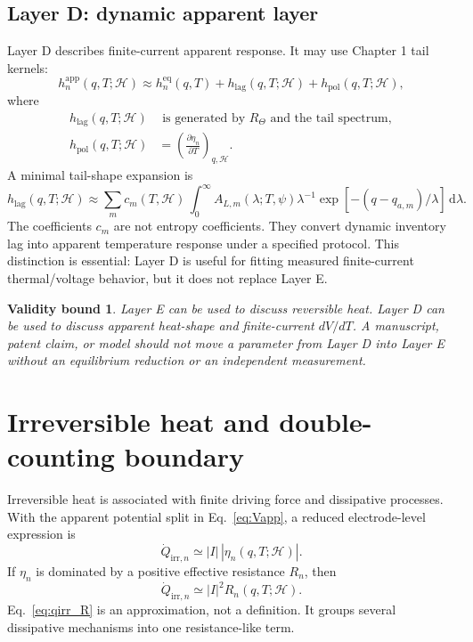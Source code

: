 \documentclass[11pt,a4paper]{article}
\newtheorem*{boundbox}{Validity bound}
\newcommand{\dd}{\mathrm{d}}
\newcommand{\eqs}{\mathrm{eq}}
\newcommand{\app}{\mathrm{app}}
\newcommand{\irr}{\mathrm{irr}}
\newcommand{\pol}{\mathrm{pol}}
\newcommand{\lag}{\mathrm{lag}}
\newcommand{\calH}{\mathcal H}
\begin{document}
\subsection{Layer D: dynamic apparent layer}\label{sec:layer_D}

Layer D describes finite-current apparent response. It may use Chapter 1 tail kernels:
\begin{equation}
h_n^{\app}(q,T;\calH)
\approx
h_n^{\eqs}(q,T)
+
h_{\lag}(q,T;\calH)
+
h_{\pol}(q,T;\calH),
\label{eq:h_app_decomp}
\end{equation}
where
\begin{align}
h_{\lag}(q,T;\calH)
&\text{ is generated by }R_{\Theta}\text{ and the tail spectrum},\\
h_{\pol}(q,T;\calH)
&=
\left(\frac{\partial \eta_n}{\partial T}\right)_{q,\calH}.
\end{align}
A minimal tail-shape expansion is
\begin{equation}
h_{\lag}(q,T;\calH)
\approx
\sum_m c_m(T,\calH)\,
\int_0^\infty
A_{L,m}(\lambda;T,\psi)
\lambda^{-1}\exp[-(q-q_{a,m})/\lambda]\,\dd\lambda.
\label{eq:h_lag_basis}
\end{equation}
The coefficients \(c_m\) are not entropy coefficients. They convert dynamic inventory lag into apparent
temperature response under a specified protocol. This distinction is essential: Layer D is useful for fitting
measured finite-current thermal/voltage behavior, but it does not replace Layer E.

\begin{boundbox}
Layer E can be used to discuss reversible heat. Layer D can be used to discuss apparent heat-shape and
finite-current \(dV/dT\). A manuscript, patent claim, or model should not move a parameter from Layer D into
Layer E without an equilibrium reduction or an independent measurement.
\end{boundbox}

\section{Irreversible heat and double-counting boundary}\label{sec:irr_heat}

Irreversible heat is associated with finite driving force and dissipative processes. With the apparent potential
split in Eq.~\eqref{eq:Vapp}, a reduced electrode-level expression is
\begin{equation}
\dot Q_{\irr,n}
\simeq
|I|\,|\eta_n(q,T;\calH)|.
\label{eq:qirr_eta}
\end{equation}
If \(\eta_n\) is dominated by a positive effective resistance \(R_n\), then
\begin{equation}
\dot Q_{\irr,n}
\simeq
|I|^2R_n(q,T;\calH).
\label{eq:qirr_R}
\end{equation}
Eq.~\eqref{eq:qirr_R} is an approximation, not a definition. It groups several dissipative mechanisms into
one resistance-like term.
\end{document}
